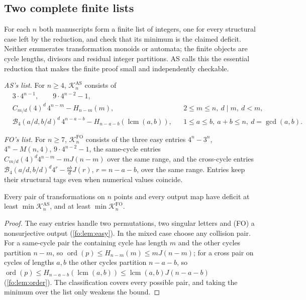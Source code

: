 \documentclass[11pt,a4paper]{article}
\numberwithin{equation}{section}
\theoremstyle{definition}
\theoremstyle{remark}
\newcommand{\ord}{\operatorname{ord}}
\newcommand{\lcm}{\operatorname{lcm}}
\newcommand{\Bip}{\mathcal B}
\begin{document}
\subsection{Two complete finite lists}

For each $n$ both manuscripts form a finite list of integers, one for every
structural case left by the reduction, and check that its minimum is the
claimed deficit. Neither enumerates transformation monoids or automata; the
finite objects are cycle lengths, divisors and residual integer partitions.
AS calls this the essential reduction that makes the finite proof small and
independently checkable.

\emph{AS's list.} For $n\ge4$, $\mathcal K^{\mathrm{AS}}_n$ consists of
\begin{align}
 &3\cdot4^{n-1},\qquad 9\cdot4^{n-2}-1,\label{fo:as:eq:listeasy}\\
 &C_{m/d}(4)^d\,4^{n-m}-H_{n-m}(m),
 &&2\le m\le n,\ d\mid m,\ d<m,\label{fo:as:eq:listsame}\\
 &\Bip_4(a/d,b/d)^d\,4^{n-a-b}-H_{n-a-b}(\lcm(a,b)),
 &&1\le a\le b,\ a+b\le n,\ d=\gcd(a,b).\label{fo:as:eq:listcross}
\end{align}

\emph{FO's list.} For $n\ge7$, $\mathcal K^{\mathrm{FO}}_n$ consists of the
three easy entries $4^n-3^n$, $4^n-M(n,4)$, $9\cdot4^{n-2}-1$, the same-cycle
entries $C_{m/d}(4)^d4^{n-m}-mJ(n-m)$ over the same range, and the cross-cycle
entries $\Bip_4(a/d,b/d)^d4^r-\frac{ab}{d}J(r)$, $r=n-a-b$, over the same
range. Entries keep their structural tags even when numerical values
coincide.

\begin{lemma}\label{fo:lem:complete}
Every pair of transformations on $n$ points and every output map have
deficit at least $\min\mathcal K^{\mathrm{AS}}_n$, and at least
$\min\mathcal K^{\mathrm{FO}}_n$.
\end{lemma}

\begin{proof}
The easy entries handle two permutations, two singular letters and (FO) a
nonsurjective output (\cref{fo:lem:easy}). In the mixed case choose any
collision pair. For a same-cycle pair the containing cycle has length $m$ and
the other cycles partition $n-m$, so $\ord(p)\le H_{n-m}(m)\le mJ(n-m)$; for a
cross pair on cycles of lengths $a,b$ the other cycles partition $n-a-b$, so
$\ord(p)\le H_{n-a-b}(\lcm(a,b))\le\lcm(a,b)J(n-a-b)$
(\cref{fo:lem:order}). The classification covers every possible pair, and
taking the minimum over the list only weakens the bound.
\end{proof}
\end{document}
